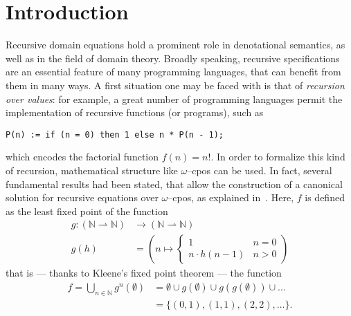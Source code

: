 \section{Introduction}

\nocite{Hemerik1988}

Recursive domain equations hold a prominent role in denotational semantics, as well as in the field of domain theory.
Broadly speaking, recursive specifications are an essential feature of many programming languages, that can benefit from them in many ways.
A first situation one may be faced with is that of \emph{recursion over values}: for example, a great number of programming languages permit the implementation of recursive functions (or programs), such as
\begin{center}
  \texttt{P(n) := if (n = 0) then 1 else n * P(n - 1);}
\end{center}
which encodes the factorial function \(f(n) = n!\).
In order to formalize this kind of recursion, mathematical structure like \(\omega\)--cpos can be used. In fact, several fundamental results had been stated, that allow the construction of a canonical solution for recursive equations over \(\omega\)--cpos, as explained in~\cite{Winskel1993}.
Here, \(f\) is defined as the least fixed point of the function
\begin{equation*}
  \begin{split}
    g \colon (\mathbb{N} \rightharpoonup \mathbb{N}) &\to (\mathbb{N} \rightharpoonup \mathbb{N}) \\
    g(h) &= \left(n \mapsto \begin{cases}1 & n = 0 \\ n\cdot h(n-1) & n > 0\end{cases}\right)
  \end{split}
\end{equation*}
that is --- thanks to Kleene's fixed point theorem --- the function
\begin{align*}
  f = \bigcup_{n\in\mathbb{N}}g^n(\emptyset) &= \emptyset \cup g(\emptyset) \cup g(g(\emptyset)) \cup \dotsc \\
  &= \lbrace (0,1), (1,1), (2,2), \dotsc \rbrace.
\end{align*}

